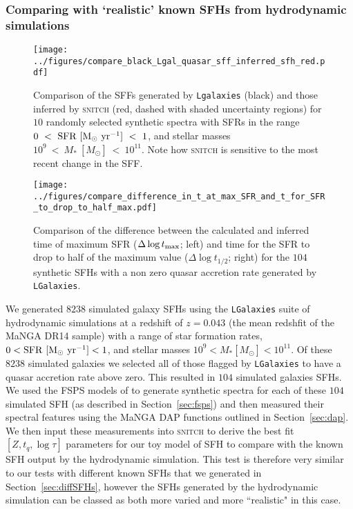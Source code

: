 \documentclass[useAMS,usenatbib]{mn2e}
\begin{document}
\subsubsection{Comparing with `realistic' known SFHs from hydrodynamic simulations}\label{sec:lgalaxies}

\begin{figure}
\centering
\texttt{[image: ../figures/compare\_black\_Lgal\_quasar\_sff\_inferred\_sfh\_red.pdf]}
\caption{Comparison of the SFFs generated by \texttt{Lgalaxies} (black) and those inferred by \textsc{snitch} (red, dashed with shaded uncertainty regions) for $10$ randomly selected synthetic spectra with SFRs in the range $0~<~\rm{SFR}~[M_{\odot}~\rm{yr}^{-1}]~<~1$, and stellar masses $10^9~<~M_{*}~[M_{\odot}]~<~10^{11}$. Note how \textsc{snitch} is sensitive to the most recent change in the SFF.}
\label{fig:lgalsfhs}
\end{figure}

\begin{figure}
\centering
\texttt{[image: ../figures/compare\_difference\_in\_t\_at\_max\_SFR\_and\_t\_for\_SFR\_to\_drop\_to\_half\_max.pdf]}
\caption{Comparison of the difference between the calculated and inferred time of maximum SFR ($\Delta \log t_{\rm{max}}$; left) and time for the SFR to drop to half of the maximum value ($\Delta \log t_{1/2}$; right) for the $104$ synthetic SFHs with a non zero quasar accretion rate generated by \texttt{LGalaxies}.}
\label{fig:genlgalsfhs}
\end{figure}

We generated $8238$ simulated galaxy SFHs using the \texttt{LGalaxies} suite of hydrodynamic simulations \citep{henriques15} at a redshift of $z=0.043$ (the mean redshfit of the MaNGA DR14 sample) with a range of star formation rates, $0 < \rm{SFR}~[M_{\odot}~\rm{yr}^{-1}] < 1$, and stellar masses $10^9 < M_{*} [M_{\odot}] < 10^{11}$. Of these $8238$ simulated galaxies we selected all of those flagged by \texttt{LGalaxies} to have a quasar accretion rate above zero. This resulted in $104$ simulated galaxies SFHs. We used the FSPS models of \cite{conroy10} to generate synthetic spectra for each of these $104$ simulated SFH (as described in Section~\ref{sec:fsps}) and then measured their spectral features using the MaNGA DAP functions outlined in Section~\ref{sec:dap}. We then input these measurements into \textsc{snitch} to derive the best fit $[Z, t_q, \log \tau]$ parameters for our toy model of SFH to compare with the known SFH output by the hydrodynamic simulation. This test is therefore very similar to our tests with different known SFHs that we generated in Section~\ref{sec:diffSFHs}, however the SFHs generated by the hydrodynamic simulation can be classed as both more varied and more ``realistic" in this case.
\end{document}
